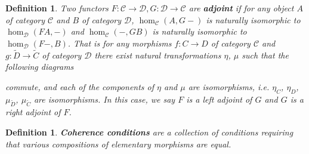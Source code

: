 \documentclass[11pt]{report}
\newcommand{\mcC}{\mathcal{C}}
\newcommand{\mcD}{\mathcal{D}}
\newtheorem{defn}[thm]{Definition} %
\begin{document}
\begin{defn}
  Two functors $F: \mcC \to \mcD, G: \mcD \to \mcC$ are \textbf{adjoint }if for any object $A$ of category $\mcC$ and $B$ of category $\mcD$,
  $\hom_{\mcC}(A,G-)$ is naturally isomorphic to $\hom_{\mcD}(FA,-)$ and $\hom_{\mcC}(-,GB)$ is naturally isomorphic to  $\hom_{\mcD}(F-,B)$.
  That is for any morphisms $f:C \to D$ of category $\mcC$ and $g: \widetilde{D} \to \widetilde{C}$ of category $\mcD$ there exist natural transformations $\eta$, $\mu$ such that the following diagrams
  \begin{center}
  \end{center}
  \begin{center}
\end{center}
  commute, and each of the components of $\eta$ and $\mu$ are isomorphisms, i.e. $\eta_C$, $\eta_D$, $\mu_{\widetilde{D}}$, $\mu_{\widetilde{C}}$ are isomorphisms. In this case, we say $F$ is a left adjoint of $G$ and $G$ is a right adjoint of $F$.
\end{defn}
\begin{defn}
  \textbf{Coherence conditions} are a collection of conditions requiring that various compositions of elementary morphisms are equal. 
\end{defn}
\end{document}

